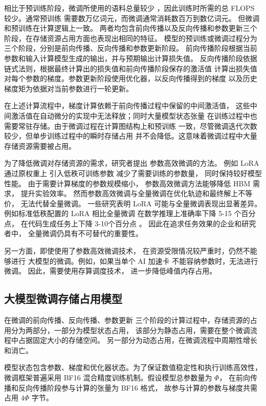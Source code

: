 \documentclass[bachelor,openany,oneside,color,AutoFakeBold=true]{buaathesis}
\begin{document}
相比于预训练阶段，微调所使用的语料总量较少
，因此训练时所需的总 FLOPS 较少。通常预训练
需要数万亿词元，而微调通常消耗数百万到数亿词元。
但微调和预训练在计算逻辑上一致。
两者均包含前向传播以及反向传播和参数更新三个阶段，在存储资源占用方面也表现出相同的特征。
模型的预训练或微调过程分为三个阶段，分别是前向传播、反向传播和参数更新阶段。
前向传播阶段根据当前参数和输入计算模型生成的输出，并与预期输出计算损失值。
反向传播阶段依据链式法则，根据最终计算出的损失值和前向传播阶段保存的激活值
计算出损失值对每个参数的梯度。参数更新阶段使用优化器，以反向传播得到的梯度
以及历史梯度矩为依据对当前参数进行一轮更新。

在上述计算流程中，梯度计算依赖于前向传播过程中保留的中间激活值，
这些中间激活值在自动微分的实现中无法释放；同时大量模型状态张量
在训练过程中也需要常驻存储。由于微调过程在计算图结构上和预训练
一致，尽管微调迭代次数较少，但单步训练过程中的瞬时存储占用
并不会降低。这意味着微调过程中大量存储资源需要被占用。

为了降低微调对存储资源的需求，研究者提出
参数高效微调的方法。 例如 LoRA 通过原权重上
引入低秩可训练参数 减少了需要训练的参数量，
同时保持较好模型性能。
由于需要计算梯度的参数规模缩小，
参数高效微调方法能够降低 HBM 需求，
提升实验效率。
然而参数高效微调与全量微调在优化轨迹和最终解上不等价，
无法代替全量微调。
一些研究表明 LoRA 可能与全量微调表现出显著差异。
例如标准低秩配置的 LoRA 相比全量微调
在数学推理上准确率下降 5-15 个百分点，
在代码生成任务上下降 3-10个百分点
。
因此在追求任务效果的企业和研究者中，
全量微调仍具有不可替代的重要性。

另一方面，即使使用了参数高效微调技术，
在资源受限情况较严重时，仍然不能够进行
大模型的微调。例如，如果当单个 AI 加速卡
不能容纳参数时，无法进行微调。
因此，需要使用存算调度技术，
进一步降低峰值内存占用。


\subsection{大模型微调存储占用模型}

在微调的前向传播、反向传播、参数更新
三个阶段的计算过程中，存储资源的占用分为两部分，一部分为模型状态占用，
该部分为静态占用，需要在整个微调流程中占据固定大小的存储空间。
另一部分为动态占用，在微调流程中周期性增长和消亡。

模型状态包含参数、梯度和优化器状态。为了保证数值稳定性和执行训练高效性，
微调框架普遍采用 BF16 混合精度训练机制。假设模型总参数量为 $\Phi$，
在前向传播和反向传播阶段参与计算的张量为 BF16 格式，
故参与计算的参数与梯度共需占用 $4\Phi$ 字节。
\end{document}
